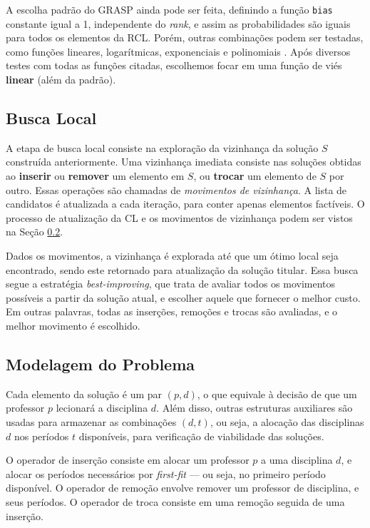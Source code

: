 \documentclass{MO824}
\begin{document}
    A escolha padrão do GRASP ainda pode ser feita, definindo a função \texttt{bias} constante igual a 1, independente do \textit{rank}, e assim as probabilidades são iguais para todos os elementos da RCL. Porém, outras combinações podem ser testadas, como funções lineares, logarítmicas, exponenciais e polinomiais \cite{grasp}. Após diversos testes com todas as funções citadas, escolhemos focar em uma função de viés \textbf{linear} (além da padrão).

    \subsection{Busca Local}
    A etapa de busca local consiste na exploração da vizinhança da solução $S$ construída anteriormente. Uma vizinhança imediata consiste nas soluções obtidas ao \textbf{inserir} ou \textbf{remover} um elemento em $S$, ou \textbf{trocar} um elemento de $S$ por outro. Essas operações são chamadas de \textit{movimentos de vizinhança}. A lista de candidatos é atualizada a cada iteração, para conter apenas elementos factíveis. O processo de atualização da CL e os movimentos de vizinhança podem ser vistos na Seção \ref{model}.
    
    Dados os movimentos, a vizinhança é explorada até que um ótimo local seja encontrado, sendo este retornado para atualização da solução titular. Essa busca segue a estratégia \textit{best-improving}, que trata de avaliar todos os movimentos possíveis a partir da solução atual, e escolher aquele que fornecer o melhor custo. Em outras palavras, todas as inserções, remoções e trocas são avaliadas, e o melhor movimento é escolhido. 
    
    \subsection{Modelagem do Problema} \label{model}
    
    Cada elemento da solução é um par $(p,d)$, o que equivale à decisão de que um professor $p$ lecionará a disciplina $d$. Além disso, outras estruturas auxiliares são usadas para armazenar as combinações $(d,t)$, ou seja, a alocação das disciplinas $d$ nos períodos $t$ disponíveis, para verificação de viabilidade das soluções.
    
    O operador de inserção consiste em alocar um professor $p$ a uma disciplina $d$, e alocar os períodos necessários por \emph{first-fit} --- ou seja, no primeiro período disponível. O operador de remoção envolve remover um professor de disciplina, e seus períodos. O operador de troca consiste em uma remoção seguida de uma inserção.
    
\end{document}
